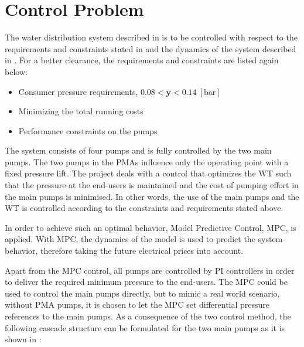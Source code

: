 \section{Control Problem}
\label{control_problem}
The water distribution system described in  is to be controlled with respect to the requirements and constraints stated in  and the dynamics of the system described in . For a better clearance, the requirements and constraints are listed again below: 
\begin{itemize}
	\item Consumer pressure requirements, $0.08 < \pmb{y} < 0.14 \:[\text{bar}]$
%
	\item Minimizing the total running costs
%
	\item Performance constraints on the pumps
\end{itemize}
The system consists of four pumps and is fully controlled by the two main pumps. The two pumps in the PMAs influence only the operating point with a fixed pressure lift. The project deals with a control that optimizes the WT such that the pressure at the end-users is maintained and the cost of pumping effort in the main pumps is minimised. In other words, the use of the main pumps and the WT is controlled according to the constraints and requirements stated above. 

In order to achieve such an optimal behavior, Model Predictive Control, MPC, is applied. With MPC, the dynamics of the model is used to predict the system behavior, therefore taking the future electrical prices into account. 

Apart from the MPC control, all pumps are controlled by PI controllers in order to deliver the required minimum pressure to the end-users. The MPC could be used to control the main pumps directly, but to mimic a real world scenario, without PMA pumps, it is chosen to let the MPC set differential pressure references to the main pumps. As a consequence of the two control method, the following cascade structure can be formulated for the two main pumps as it is shown in : 

